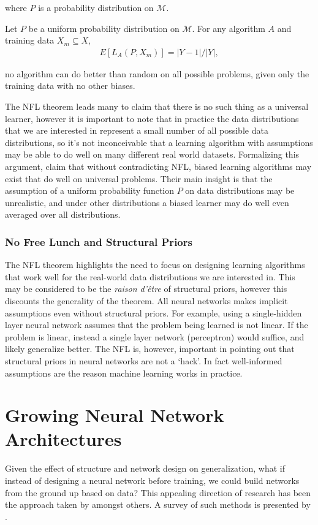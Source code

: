 \documentclass[thesis]{subfiles}
\begin{document}
where $P$ is a probability distribution on $\mathcal{M}$.

\begin{theorem}\label{NFL}
Let $P$ be a uniform probability distribution on $\mathcal{M}$. For any algorithm $A$ and training data $X_m\subseteq X$,
\begin{align}
    E\left[ L_A\left(P, X_m\right) \right] = | Y - 1 |/|Y|,
\end{align}
\end{theorem}

\ie no algorithm can do better than random on all possible problems, given only the training data with no other biases.

The NFL theorem leads many to claim that there is no such thing as a universal learner, however it is important to note that in practice the data distributions that we are interested in represent a small number of all possible data distributions, so it's not inconceivable that a learning algorithm with assumptions may be able to do well on many different real world datasets. Formalizing this argument, \citet{lattimore2013no} claim that without contradicting NFL, biased learning algorithms may exist that do well on universal problems. Their main insight is that the assumption of a uniform probability function $P$ on data distributions may be unrealistic, and under other distributions a biased learner may do well even averaged over all distributions.

\subsubsection{No Free Lunch and Structural Priors}
The NFL theorem highlights the need to focus on designing learning algorithms that work well for the real-world data distributions we are interested in. This may be considered to be the \emph{raison d'\^{e}tre} of structural priors, however this discounts the generality of the theorem. All neural networks makes implicit assumptions even without structural priors. For example, using a single-hidden  layer neural network assumes that the problem being learned is not linear. If the problem is linear, instead a single layer network (perceptron) would suffice, and likely generalize better. The NFL is, however, important in pointing out that structural priors in neural networks are not a `hack'. In fact well-informed assumptions are the reason machine learning works in practice.

\section{Growing Neural Network Architectures}
	Given the effect of structure and network design on generalization, what if instead of designing a neural network before training, we could build networks from the ground up based on data? This appealing direction of research has been the approach taken by \citet{mezard1989learning,Fahlman1989,MacKay91,mackay1992practical,hypernetworks} amongst others. A survey of such methods is presented by \citet{parekh2000constructive}.
	
\end{document}
